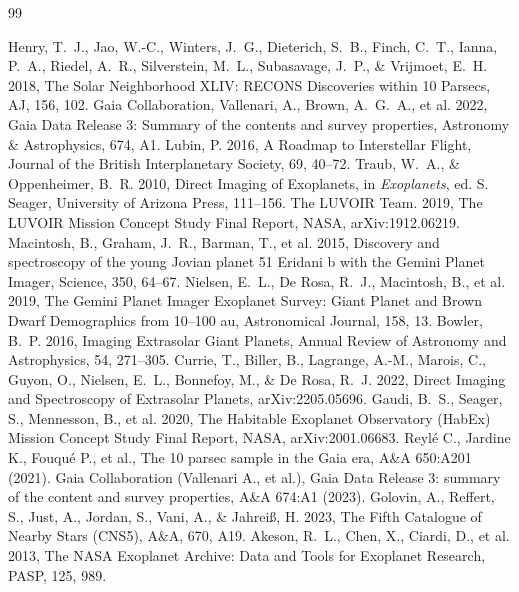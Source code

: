 

\begin{thebibliography}{99}\small

 Henry, T.~J., Jao, W.-C., Winters, J.~G., Dieterich, S.~B., Finch, C.~T., Ianna, P.~A., Riedel, A.~R., Silverstein, M.~L., Subasavage, J.~P., \& Vrijmoet, E.~H. 2018, The Solar Neighborhood XLIV: RECONS Discoveries within 10 Parsecs, AJ, 156, 102.
Gaia Collaboration, Vallenari, A., Brown, A.~G.~A., et al. 2022,
Gaia Data Release 3: Summary of the contents and survey properties,
Astronomy \& Astrophysics, 674, A1.
Lubin, P. 2016,
A Roadmap to Interstellar Flight,
Journal of the British Interplanetary Society,
69, 40--72.
 Traub, W.~A., \& Oppenheimer, B.~R. 2010, Direct Imaging of Exoplanets, in \textit{Exoplanets}, ed. S. Seager, University of Arizona Press, 111--156.
The LUVOIR Team. 2019, The LUVOIR Mission Concept Study Final Report, NASA, arXiv:1912.06219.
 Macintosh, B., Graham, J.~R., Barman, T., et al. 2015, Discovery and spectroscopy of the young Jovian planet 51 Eridani b with the Gemini Planet Imager, Science, 350, 64--67.
 Nielsen, E.~L., De Rosa, R.~J., Macintosh, B., et al. 2019, The Gemini Planet Imager Exoplanet Survey: Giant Planet and Brown Dwarf Demographics from 10--100 au, Astronomical Journal, 158, 13.
 Bowler, B.~P. 2016, Imaging Extrasolar Giant Planets, Annual Review of Astronomy and Astrophysics, 54, 271--305.
 Currie, T., Biller, B., Lagrange, A.-M., Marois, C., Guyon, O., Nielsen, E.~L., Bonnefoy, M., \& De Rosa, R.~J. 2022, Direct Imaging and Spectroscopy of Extrasolar Planets, arXiv:2205.05696.
 Gaudi, B.~S., Seager, S., Mennesson, B., et al. 2020, The Habitable Exoplanet Observatory (HabEx) Mission Concept Study Final Report, NASA, arXiv:2001.06683.
 Reyl\'{e} C., Jardine K., Fouqu\'{e} P., et al., The 10 parsec sample in the Gaia era, A\&A 650:A201 (2021).
 Gaia Collaboration (Vallenari A., et al.), Gaia Data Release 3: summary of the content and survey properties, A\&A 674:A1 (2023).
 Golovin, A., Reffert, S., Just, A., Jordan, S., Vani, A., \& Jahrei{\ss}, H. 2023, The Fifth Catalogue of Nearby Stars (CNS5), A\&A, 670, A19.
 Akeson, R.~L., Chen, X., Ciardi, D., et al. 2013, The NASA Exoplanet Archive: Data and Tools for Exoplanet Research, PASP, 125, 989.

\end{thebibliography}
